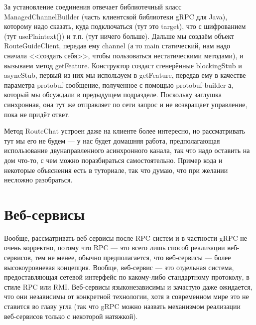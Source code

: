 \documentclass{../../text-style}
\begin{document}
За установление соединения отвечает библиотечный класс ManagedChannelBuilder (часть клиентской библиотеки gRPC для Java), которому надо сказать, куда подключаться (тут это target), что с шифрованием (тут usePlaintext()) и т.п. (тут ничего больше). Дальше мы создаём объект RouteGuideClient, передав ему channel (а то main статический, нам надо сначала <<создать себя>>, чтобы пользоваться нестатическими методами), и вызываем метод getFeature. Конструктор создаст сгенерённые blockingStub и asyncStub, первый из них мы используем в getFeature, передав ему в качестве параметра protobuf-сообщение, полученное с помощью protobuf-builder-а, который мы обсуждали в предыдущем подразделе. Поскольку заглушка синхронная, она тут же отправляет по сети запрос и не возвращает управление, пока не придёт ответ.

Метод RouteChat устроен даже на клиенте более интересно, но рассматривать тут мы его не будем --- у нас будет домашняя работа, предполагающая использование двунаправленного асинхронного канала, так что надо оставить на дом что-то, с чем можно поразбираться самостоятельно. Пример кода и некоторые объяснения есть в туториале, так что думаю, что при желании несложно разобраться.

\section{Веб-сервисы}

Вообще, рассматривать веб-сервисы после RPC-систем и в частности gRPC не очень корректно, потому что RPC --- это всего лишь способ реализации веб-сервисов, тем не менее, обычно предполагается, что веб-сервисы --- более высокоуровневая концепция. Вообще, веб-сервис --- это отдельная система, предоставляющая сетевой интерфейс по какому-либо стандартному протоколу, в стиле RPC или RMI. Веб-сервисы языконезависимы и зачастую даже ожидается, что они независимы от конкретной технологии, хотя в современном мире это не ставится во главу угла (так что gRPC можно назвать механизмом реализации веб-сервисов только с некоторой натяжкой). 
\end{document}
